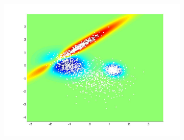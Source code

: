 \documentclass[useAMS,usenatbib,fleqn]{mn2e}
\begin{document}
\begin{figure}
\begin{subfigure}[b]{70 px}
                \includegraphics[trim = 150px 100px 150px 70px, clip=true,width=\textwidth]{VC3.jpg}
        \end{subfigure}
       

\end{figure}
\end{document}

